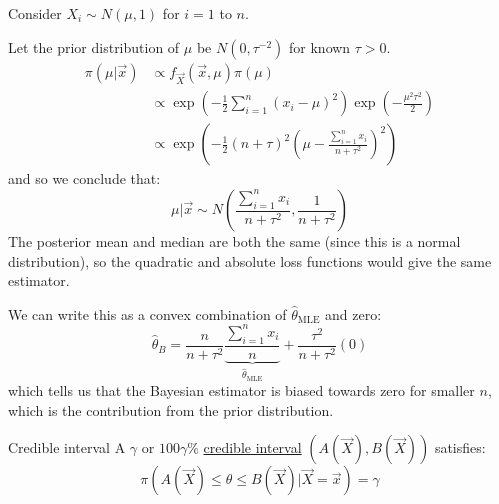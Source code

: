 \documentclass[../Main.tex]{subfiles}
\begin{document}
\begin{example}
    Consider $X_i \sim N(\mu, 1)$ for $i = 1$ to $n$.

    Let the prior distribution of $\mu$ be $N(0, \tau^{-2})$ for known $\tau > 0$.
    \begin{align*}
        \pi(\mu | \vec{x}) &\propto f_{\vec{X}}(\vec{x}, \mu) \pi(\mu) \\
        &\propto \exp\left(-\frac12 \sum_{i=1}^{n} (x_i - \mu)^2\right) \exp\left(-\frac{\mu^2\tau^2}{2}\right) \\
        &\propto \exp\left(-\frac12 (n + \tau)^2 \left(\mu - \frac{\sum_{i=1}^{n} x_i}{n + \tau^2}\right)^2\right)
    \end{align*}
    and so we conclude that:
    \begin{equation*}
        \mu | \vec{x} \sim N\left(\frac{\sum_{i=1}^{n} x_i}{n + \tau^2}, \frac{1}{n+\tau^2}\right)
    \end{equation*}
    The posterior mean and median are both the same (since this is a normal distribution), so the quadratic and absolute loss functions would give the same estimator.

    We can write this as a convex combination of $\hat{\theta}_{\text{MLE}}$ and zero:
    \begin{equation*}
        \hat{\theta}_B = \frac{n}{n+\tau^2} \underbrace{\frac{\sum_{i=1}^{n}x_i}{n}}_{\hat{\theta}_{\text{MLE}}} + \frac{\tau^2}{n + \tau^2} (0)
    \end{equation*}
    which tells us that the Bayesian estimator is biased towards zero for smaller $n$, which is the contribution from the prior distribution.
\end{example}
\begin{definition}{Credible interval}
    A $\gamma$ or $100\gamma\%$ \underline{credible interval} $(A(\vec{X}), B(\vec{X}))$ satisfies:
    \begin{equation*}
        \pi(A(\vec{X}) \leq \theta \leq B(\vec{X}) | \vec{X} = \vec{x}) = \gamma
    \end{equation*}
\end{definition}
\end{document}
